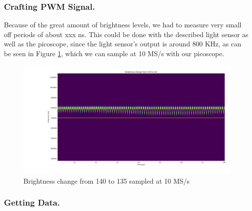 \subsubsection{Crafting PWM Signal.}

Because of the great amount of brightness levels, we had to measure very small off periods of about xxx ns. This could be done with the described light sensor as well as the picoscope, since the light sensor's output is around 800 KHz, as can be seen in Figure \ref{fig:plot-140-135}, which we can sample at 10 MS/s with our picoscope.

\begin{figure}[h]
	\centering
	\includegraphics[width=14cm]{img/Plot_140_135.png}
	\caption{Brightness change from 140 to 135 sampled at 10 MS/s}
	\label{fig:plot-140-135}
\end{figure}

\subsubsection{Getting Data.}
